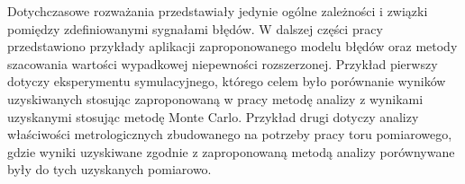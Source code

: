 Dotychczasowe rozważania przedstawiały jedynie ogólne zależności i związki pomiędzy zdefiniowanymi sygnałami błędów. W dalszej części pracy przedstawiono przykłady aplikacji zaproponowanego modelu błędów oraz metody szacowania wartości wypadkowej niepewności rozszerzonej. Przykład pierwszy dotyczy eksperymentu symulacyjnego, którego celem było porównanie wyników uzyskiwanych stosując zaproponowaną w pracy metodę analizy z wynikami uzyskanymi stosując metodę Monte Carlo. Przykład drugi dotyczy analizy właściwości metrologicznych zbudowanego na potrzeby pracy toru pomiarowego, gdzie wyniki uzyskiwane zgodnie z zaproponowaną metodą analizy porównywane były do tych uzyskanych pomiarowo.
